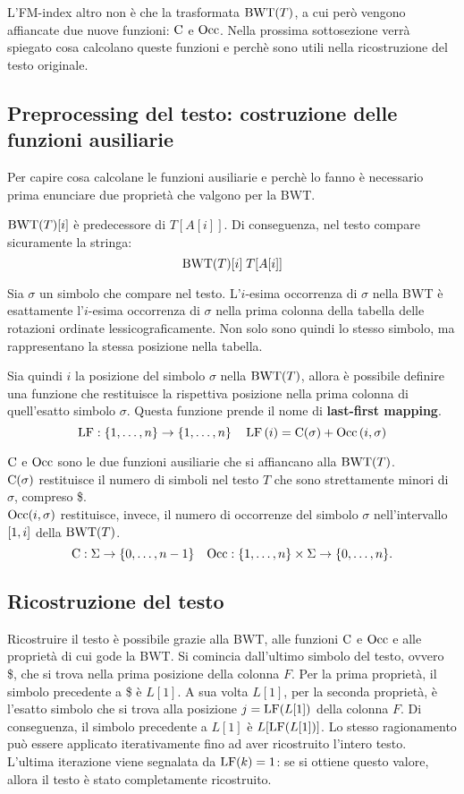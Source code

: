 L'FM-index altro non è che la trasformata $\textnormal{BWT}(T)$, a cui però vengono affiancate due nuove funzioni: $\textnormal{C}$ e $\textnormal{Occ}$.
Nella prossima sottosezione verrà spiegato cosa calcolano queste funzioni e perchè sono utili nella ricostruzione del testo originale.

\subsection{Preprocessing del testo: costruzione delle funzioni ausiliarie}
Per capire cosa calcolane le funzioni ausiliarie e perchè lo fanno è necessario prima enunciare due proprietà che valgono per la BWT.\\
\begin{property}
    $\textnormal{BWT}(T)[i]$ è predecessore di $T[A[i]]$. Di conseguenza, nel testo compare sicuramente la stringa:
    \[
        \textnormal{BWT}(T)[i] \; T[A[i]]
    \]
\end{property}
\begin{property}
    Sia $\sigma$ un simbolo che compare nel testo. L'$i$-esima occorrenza di $\sigma$ nella BWT è esattamente l'$i$-esima occorrenza di $\sigma$ nella prima colonna della tabella delle rotazioni ordinate lessicograficamente.
    Non solo sono quindi lo stesso simbolo, ma rappresentano la stessa posizione nella tabella.
\end{property}
Sia quindi $i$ la posizione del simbolo $\sigma$ nella $\textnormal{BWT}(T)$, allora è possibile definire una funzione che restituisce la rispettiva posizione nella prima colonna di quell'esatto simbolo $\sigma$. Questa funzione prende il nome di \textbf{last-first mapping}.
\[
    \textnormal{LF}: \left\{1, \ldots, n\right\} \rightarrow \left\{1, \ldots, n\right\} \quad \textnormal{LF} \left(i\right) = \textnormal{C}(\sigma) + \textnormal{Occ} \left(i, \sigma\right)
\]

$\textnormal{C}$ e $\textnormal{Occ}$ sono le due funzioni ausiliarie che si affiancano alla $\textnormal{BWT}(T)$.\\
$\textnormal{C}(\sigma)$ restituisce il numero di simboli nel testo $T$ che sono strettamente minori di $\sigma$, compreso \$.\\
$\textnormal{Occ} (i, \sigma)$ restituisce, invece, il numero di occorrenze del simbolo $\sigma$ nell'intervallo $\left[1, i\right]$ della $\textnormal{BWT}(T)$.
\[
\textnormal{C}: \Sigma \rightarrow \{ 0, \ldots, n-1 \} \quad \textnormal{Occ}: \{ 1, \ldots, n \} \times \Sigma \rightarrow \{ 0, \ldots, n \}.
\]

\subsection{Ricostruzione del testo}
Ricostruire il testo è possibile grazie alla BWT, alle funzioni $\textnormal{C}$ e $\textnormal{Occ}$ e alle proprietà di cui gode la BWT.
Si comincia dall'ultimo simbolo del testo, ovvero \$, che si trova nella prima posizione della colonna $F$. 
Per la prima proprietà, il simbolo precedente a \$ è $L[1]$.
A sua volta $L[1]$, per la seconda proprietà, è l'esatto simbolo che si trova alla posizione $j = \textnormal{LF}(L[1])$ della colonna $F$. Di conseguenza, il simbolo precedente a $L[1]$ è $L[\textnormal{LF}(L[1])]$.
Lo stesso ragionamento può essere applicato iterativamente fino ad aver ricostruito l'intero testo.\\
L'ultima iterazione viene segnalata da $\textnormal{LF}(k) = 1$: se si ottiene questo valore, allora il testo è stato completamente ricostruito.